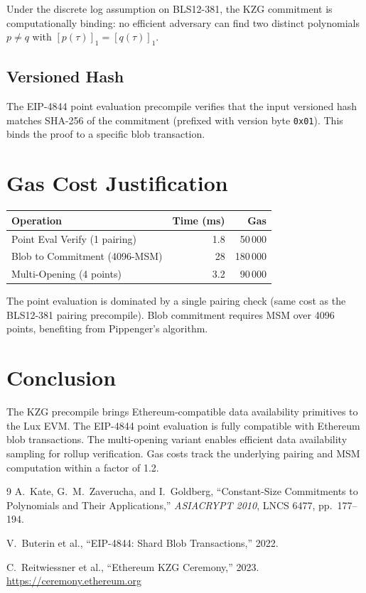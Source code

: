 \documentclass[11pt,a4paper]{article}
\begin{document}
Under the discrete log assumption on BLS12-381, the KZG commitment is
computationally binding: no efficient adversary can find two distinct polynomials
$p \neq q$ with $[p(\tau)]_1 = [q(\tau)]_1$.

\subsection{Versioned Hash}

The EIP-4844 point evaluation precompile verifies that the input versioned hash
matches SHA-256 of the commitment (prefixed with version byte \texttt{0x01}).
This binds the proof to a specific blob transaction.

\section{Gas Cost Justification}

\begin{table}[H]
\centering
\begin{tabular}{lrr}
\toprule
\textbf{Operation} & \textbf{Time (ms)} & \textbf{Gas} \\
\midrule
Point Eval Verify (1 pairing) & 1.8 & 50\,000 \\
Blob to Commitment (4096-MSM) & 28 & 180\,000 \\
Multi-Opening (4 points) & 3.2 & 90\,000 \\
\bottomrule
\end{tabular}
\end{table}

The point evaluation is dominated by a single pairing check (same cost as the
BLS12-381 pairing precompile). Blob commitment requires MSM over 4096 points,
benefiting from Pippenger's algorithm.

\section{Conclusion}

The KZG precompile brings Ethereum-compatible data availability primitives to the
Lux EVM. The EIP-4844 point evaluation is fully compatible with Ethereum blob
transactions. The multi-opening variant enables efficient data availability
sampling for rollup verification. Gas costs track the underlying pairing and
MSM computation within a factor of 1.2.

\begin{thebibliography}{9}
  A.~Kate, G.~M.~Zaverucha, and I.~Goldberg, ``Constant-Size Commitments
  to Polynomials and Their Applications,''
  \textit{ASIACRYPT 2010}, LNCS 6477, pp.~177--194.

  V.~Buterin et al., ``EIP-4844: Shard Blob Transactions,'' 2022.

  C.~Reitwiessner et al., ``Ethereum KZG Ceremony,'' 2023.
  \url{https://ceremony.ethereum.org}
\end{thebibliography}
\end{document}
